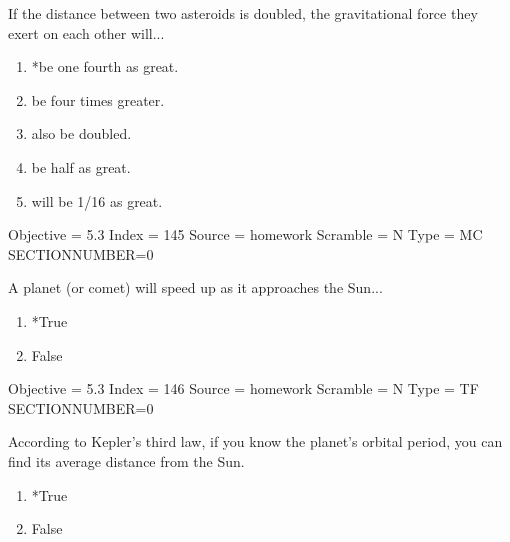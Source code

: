 \documentclass[11pt]{article}
\begin{document}
\begin{enumerate}
\begin{minipage}{\textwidth}
\begin{minipage}{\textwidth}
\item If the distance between two asteroids is doubled, the gravitational force they exert on each other will...
\begin{multicols}{2}
\begin{enumerate} 
\setlength{\itemsep}{1pt} 
\setlength{\parskip}{0pt} 
\setlength{\parsep}{0pt}
\setlength{\multicolsep}{1pt} 
\item *be one fourth as great.
\item be four times greater.
\item also be doubled.
\item be half as great.
\item will be 1/16 as great.
\end{enumerate} 
\vfill 
\end{multicols}

Objective = 5.3
Index = 145
Source = homework
Scramble = N
Type = MC
SECTIONNUMBER=0
\end{minipage}
\end{minipage}
\vskip 0.20in

\begin{minipage}{\textwidth}
\begin{minipage}{\textwidth}
\item A planet (or comet) will speed up as it approaches the Sun...
\begin{multicols}{3}
\begin{enumerate} 
\setlength{\itemsep}{1pt} 
\setlength{\parskip}{0pt} 
\setlength{\parsep}{0pt}
\setlength{\multicolsep}{1pt} 
\item *True
\item False
\end{enumerate} 
\vfill 
\end{multicols}

Objective = 5.3
Index = 146
Source = homework
Scramble = N
Type = TF
SECTIONNUMBER=0
\end{minipage}
\end{minipage}
\vskip 0.20in

\begin{minipage}{\textwidth}
\begin{minipage}{\textwidth}
\item According to Kepler's third law, if you know the planet's orbital period, you can find its average distance from the Sun.
\begin{multicols}{3}
\begin{enumerate} 
\setlength{\itemsep}{1pt} 
\setlength{\parskip}{0pt} 
\setlength{\parsep}{0pt}
\setlength{\multicolsep}{1pt} 
\item *True
\item False
\end{enumerate} 
\vfill 
\end{multicols}


\end{minipage}
\end{minipage}
\end{enumerate}
\end{document}
